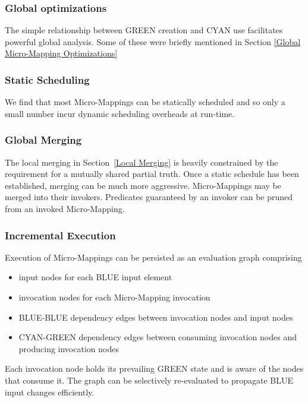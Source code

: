\documentclass[conference]{IEEEtran}
\begin{document}
\subsubsection{Global optimizations}

The simple relationship between GREEN creation and CYAN use facilitates powerful global analysis. Some of these were briefly mentioned in Section \ref{Global Micro-Mapping Optimizations}

\subsubsection{Static Scheduling}

We find that most Micro-Mappings can be statically scheduled and so only a small number incur dynamic scheduling overheads at run-time.  

\subsubsection{Global Merging}

The local merging in Section~\ref{Local Merging} is heavily constrained by the requirement for a mutually shared partial truth. Once a static schedule has been established, merging can be much more aggressive. Micro-Mappings may be merged into their invokers. Predicates guaranteed by an invoker can be pruned from an invoked Micro-Mapping. 


\subsubsection{Incremental Execution}

Execution of Micro-Mappings can be persisted as an evaluation graph comprising
\begin{itemize}
\item input nodes for each BLUE input element
\item invocation nodes for each Micro-Mapping invocation
\item BLUE-BLUE dependency edges between invocation nodes and input nodes
\item CYAN-GREEN dependency edges between consuming invocation nodes and producing invocation nodes
\end{itemize}
Each invocation node holds its prevailing GREEN state and is aware of the nodes that consume it.
The graph can be selectively re-evaluated to propagate BLUE input changes efficiently. 
\end{document}
